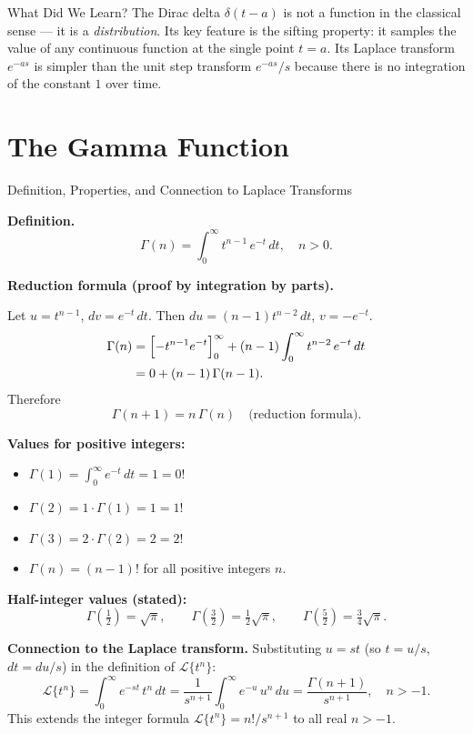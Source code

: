 \documentclass[12pt,a4paper]{article}
\begin{document}
\begin{learnbox}{What Did We Learn?}
The Dirac delta $\delta(t-a)$ is not a function in the classical sense --- it
is a \emph{distribution}. Its key feature is the sifting property: it samples
the value of any continuous function at the single point $t=a$. Its Laplace
transform $e^{-as}$ is simpler than the unit step transform $e^{-as}/s$ because
there is no integration of the constant $1$ over time.
\end{learnbox}

\section{The Gamma Function}

\begin{infobox}{Definition, Properties, and Connection to Laplace Transforms}

\textbf{Definition.}
\[
  \Gamma(n) = \int_0^{\infty} t^{n-1}\, e^{-t}\, dt, \quad n > 0.
\]

\medskip
\textbf{Reduction formula (proof by integration by parts).}

Let $u = t^{n-1}$, $dv = e^{-t}\,dt$. Then $du = (n-1)t^{n-2}\,dt$,
$v = -e^{-t}$.
\begin{align*}
  \Gamma(n)
  &= \Bigl[-t^{n-1}e^{-t}\Bigr]_0^{\infty}
     + (n-1)\int_0^{\infty} t^{n-2}\,e^{-t}\,dt \\
  &= 0 + (n-1)\,\Gamma(n-1).
\end{align*}
Therefore
\[
  \Gamma(n+1) = n\,\Gamma(n) \quad \text{(reduction formula)}.
\]

\medskip
\textbf{Values for positive integers:}
\begin{itemize}
  \item $\Gamma(1) = \int_0^{\infty} e^{-t}\,dt = 1 = 0!$
  \item $\Gamma(2) = 1\cdot\Gamma(1) = 1 = 1!$
  \item $\Gamma(3) = 2\cdot\Gamma(2) = 2 = 2!$
  \item $\Gamma(n) = (n-1)!$ for all positive integers $n$.
\end{itemize}

\medskip
\textbf{Half-integer values (stated):}
\[
  \Gamma\!\left(\tfrac{1}{2}\right) = \sqrt{\pi}, \qquad
  \Gamma\!\left(\tfrac{3}{2}\right) = \tfrac{1}{2}\sqrt{\pi}, \qquad
  \Gamma\!\left(\tfrac{5}{2}\right) = \tfrac{3}{4}\sqrt{\pi}.
\]

\medskip
\textbf{Connection to the Laplace transform.}
Substituting $u = st$ (so $t = u/s$, $dt = du/s$) in the definition of $\mathcal{L}\{t^n\}$:
\[
  \mathcal{L}\{t^n\} = \int_0^{\infty} e^{-st}\,t^n\,dt
  = \frac{1}{s^{n+1}}\int_0^{\infty} e^{-u}\,u^n\,du
  = \frac{\Gamma(n+1)}{s^{n+1}}, \quad n > -1.
\]
This extends the integer formula $\mathcal{L}\{t^n\} = n!/s^{n+1}$ to all
real $n > -1$.

\end{infobox}
\end{document}
